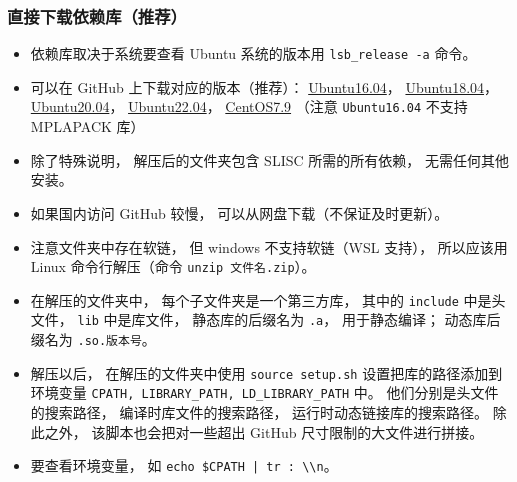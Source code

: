 \subsubsection{直接下载依赖库（推荐）}
\begin{itemize}
\item 依赖库取决于系统要查看 Ubuntu 系统的版本用 \verb`lsb_release -a` 命令。
\item 可以在 GitHub 上下载对应的版本（推荐）： \href{https://github.com/MacroUniverse/SLISC-libs-x64-ubuntu16.04}{Ubuntu16.04}， \href{https://github.com/MacroUniverse/SLISC-libs-x64-ubuntu18.04}{Ubuntu18.04}， \href{https://github.com/MacroUniverse/SLISC-libs-x64-ubuntu20.04}{Ubuntu20.04}， \href{https://github.com/MacroUniverse/SLISC-libs-x64-ubuntu22.04}{Ubuntu22.04}， \href{https://github.com/MacroUniverse/SLISC-libs-x64-centos7.9.2009}{CentOS7.9} （注意 \verb`Ubuntu16.04` 不支持 MPLAPACK 库）
\item 除了特殊说明， 解压后的文件夹包含 SLISC 所需的所有依赖， 无需任何其他安装。
\item 如果国内访问 GitHub 较慢， 可以从网盘下载（不保证及时更新）。
\item 注意文件夹中存在软链， 但 windows 不支持软链（WSL 支持）， 所以应该用 Linux 命令行解压（命令 \verb`unzip 文件名.zip`）。
\item 在解压的文件夹中， 每个子文件夹是一个第三方库， 其中的 \verb`include` 中是头文件， \verb`lib` 中是库文件， 静态库的后缀名为 \verb`.a`， 用于静态编译； 动态库后缀名为 \verb`.so.版本号`。
\item 解压以后， 在解压的文件夹中使用 \verb`source setup.sh` 设置把库的路径添加到环境变量 \verb`CPATH, LIBRARY_PATH, LD_LIBRARY_PATH` 中。 他们分别是头文件的搜索路径， 编译时库文件的搜索路径， 运行时动态链接库的搜索路径。 除此之外， 该脚本也会把对一些超出 GitHub 尺寸限制的大文件进行拼接。
\item 要查看环境变量， 如 \verb`echo $CPATH | tr : \\n`。
\end{itemize}

